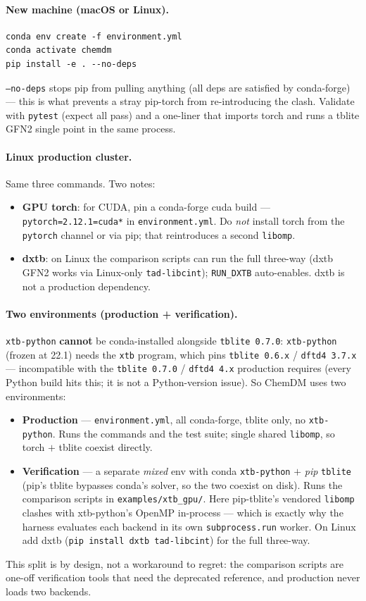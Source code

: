 \documentclass[11pt]{article}
\newcommand{\code}[1]{\texttt{#1}}
\newcommand{\xtbpy}{\code{xtb-python}}
\begin{document}
\paragraph{New machine (macOS or Linux).}
\begin{verbatim}
conda env create -f environment.yml
conda activate chemdm
pip install -e . --no-deps
\end{verbatim}
\code{--no-deps} stops pip from pulling anything (all deps are satisfied by
conda-forge) --- this is what prevents a stray pip-torch from re-introducing the
clash. Validate with \code{pytest} (expect all pass) and a one-liner that imports
torch and runs a tblite GFN2 single point in the same process.

\paragraph{Linux production cluster.} Same three commands. Two notes:
\begin{itemize}
  \item \textbf{GPU torch}: for CUDA, pin a conda-forge cuda build ---
  \code{pytorch=2.12.1=cuda*} in \code{environment.yml}. Do \emph{not} install
  torch from the \code{pytorch} channel or via pip; that reintroduces a second
  \code{libomp}.
  \item \textbf{dxtb}: on Linux the comparison scripts can run the full three-way
  (dxtb GFN2 works via Linux-only \code{tad-libcint}); \code{RUN\_DXTB} auto-enables.
  dxtb is not a production dependency.
\end{itemize}

\paragraph{Two environments (production + verification).} \xtbpy{} \textbf{cannot}
be conda-installed alongside \code{tblite 0.7.0}: \xtbpy{} (frozen at 22.1) needs
the \code{xtb} program, which pins \code{tblite 0.6.x} / \code{dftd4 3.7.x} ---
incompatible with the \code{tblite 0.7.0} / \code{dftd4 4.x} production requires
(every Python build hits this; it is not a Python-version issue). So ChemDM uses
two environments:
\begin{itemize}
  \item \textbf{Production} --- \code{environment.yml}, all conda-forge, tblite
  only, no \xtbpy{}. Runs the commands and the test suite; single shared
  \code{libomp}, so torch $+$ tblite coexist directly.
  \item \textbf{Verification} --- a separate \emph{mixed} env with conda
  \xtbpy{} $+$ \emph{pip} \code{tblite} (pip's tblite bypasses conda's solver, so
  the two coexist on disk). Runs the comparison scripts in
  \code{examples/xtb\_gpu/}. Here pip-tblite's vendored \code{libomp} clashes with
  xtb-python's OpenMP in-process --- which is exactly why the harness evaluates
  each backend in its own \code{subprocess.run} worker. On Linux add dxtb
  (\code{pip install dxtb tad-libcint}) for the full three-way.
\end{itemize}
This split is by design, not a workaround to regret: the comparison scripts are
one-off verification tools that need the deprecated reference, and production
never loads two backends.
\end{document}
